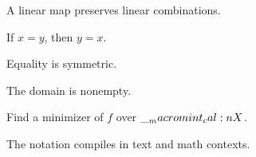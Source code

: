 \documentclass{article}
\begin{document}
\begin{proposition}
  A linear map preserves linear combinations.
\end{proposition}

\begin{lemma}
  If $x = y$, then $y = x$.
\end{lemma}

\begin{corollary}
  Equality is symmetric.
\end{corollary}

\begin{assumption}
  The domain is nonempty.
\end{assumption}

\begin{problem}
  Find a minimizer of $f$ over $\__macromint_cal:n {X}$.
\end{problem}

\begin{remark}
  The notation compiles in text and math contexts.
\end{remark}
\end{document}
